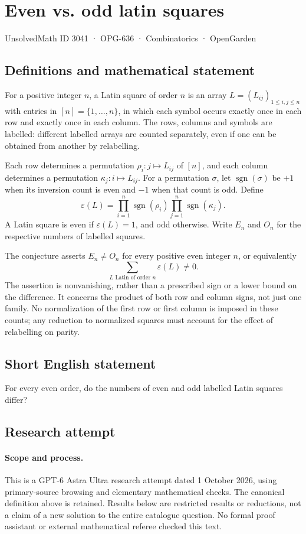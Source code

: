 \documentclass[11pt,a4paper]{article}
\begin{document}
\section*{Even vs. odd latin squares}\label{3041}
{\small UnsolvedMath ID 3041 · OPG-636 · Combinatorics · OpenGarden}
\subsection{Definitions and mathematical statement}
For a positive integer $n$, a Latin square of order $n$ is an array
$L=(L_{ij})_{1\le i,j\le n}$ with entries in $[n]=\{1,\ldots,n\}$, in which
each symbol occurs exactly once in each row and exactly once in each column.
The rows, columns and symbols are labelled: different labelled arrays are
counted separately, even if one can be obtained from another by relabelling.

Each row determines a permutation $\rho_i:j\mapsto L_{ij}$ of $[n]$, and
each column determines a permutation $\kappa_j:i\mapsto L_{ij}$.
For a permutation $\sigma$, let $\operatorname{sgn}(\sigma)$ be $+1$ when
its inversion count is even and $-1$ when that count is odd. Define
\[
 \varepsilon(L)=\prod_{i=1}^n\operatorname{sgn}(\rho_i)
                 \prod_{j=1}^n\operatorname{sgn}(\kappa_j).
\]
A Latin square is even if $\varepsilon(L)=1$, and odd otherwise. Write
$E_n$ and $O_n$ for the respective numbers of labelled squares.

The conjecture asserts $E_n\ne O_n$ for every positive even integer $n$,
or equivalently
\[
 \sum_{L\text{ Latin of order }n}\varepsilon(L)\ne0.
\]
The assertion is nonvanishing, rather than a prescribed sign or a lower
bound on the difference. It concerns the product of both row and column
signs, not just one family. No normalization of the first row or first
column is imposed in these counts; any reduction to normalized squares
must account for the effect of relabelling on parity.
\subsection{Short English statement}
For every even order, do the numbers of even and odd labelled Latin squares differ?
\subsection{Research attempt}
\paragraph{Scope and process.}
This is a GPT-6 Astra Ultra research attempt dated 1 October 2026, using
primary-source browsing and elementary mathematical checks. The canonical
definition above is retained. Results below are restricted results or
reductions, not a claim of a new solution to the entire catalogue question.
No formal proof assistant or external mathematical referee checked this text.
\end{document}
